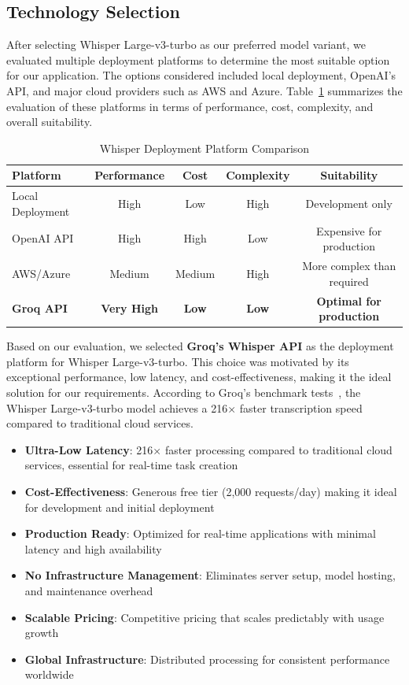 \documentclass[12pt,a4paper]{article}
\begin{document}
\subsection{Technology Selection}

After selecting Whisper Large-v3-turbo as our preferred model variant, we evaluated multiple deployment platforms to determine the most suitable option for our application. The options considered included local deployment, OpenAI's API, and major cloud providers such as AWS and Azure. Table~\ref{tab:deployment-comparison} summarizes the evaluation of these platforms in terms of performance, cost, complexity, and overall suitability.  

\begin{table}[H]
\centering
\begin{tabular}{|l|c|c|c|c|}
\hline
\textbf{Platform} & \textbf{Performance} & \textbf{Cost} & \textbf{Complexity} & \textbf{Suitability} \\
\hline
Local Deployment & High & Low & High & Development only \\
\hline
OpenAI API & High & High & Low & Expensive for production \\
\hline
AWS/Azure & Medium & Medium & High & More complex than required \\
\hline
\textbf{Groq API} & \textbf{Very High} & \textbf{Low} & \textbf{Low} & \textbf{Optimal for production} \\
\hline
\end{tabular}
\caption{Whisper Deployment Platform Comparison}
\label{tab:deployment-comparison}
\end{table}


Based on our evaluation, we selected \textbf{Groq's Whisper API} as the deployment platform for Whisper Large-v3-turbo. This choice was motivated by its exceptional performance, low latency, and cost-effectiveness, making it the ideal solution for our requirements. According to Groq’s benchmark tests~\cite{groq_whisper_benchmark}, the Whisper Large-v3-turbo model achieves a 216× faster transcription speed compared to traditional cloud services.


\begin{itemize}
    \item \textbf{Ultra-Low Latency}: 216× faster processing compared to traditional cloud services, essential for real-time task creation
    \item \textbf{Cost-Effectiveness}: Generous free tier (2,000 requests/day) making it ideal for development and initial deployment
    \item \textbf{Production Ready}: Optimized for real-time applications with minimal latency and high availability
    \item \textbf{No Infrastructure Management}: Eliminates server setup, model hosting, and maintenance overhead
    \item \textbf{Scalable Pricing}: Competitive pricing that scales predictably with usage growth
    \item \textbf{Global Infrastructure}: Distributed processing for consistent performance worldwide
\end{itemize}
\end{document}
